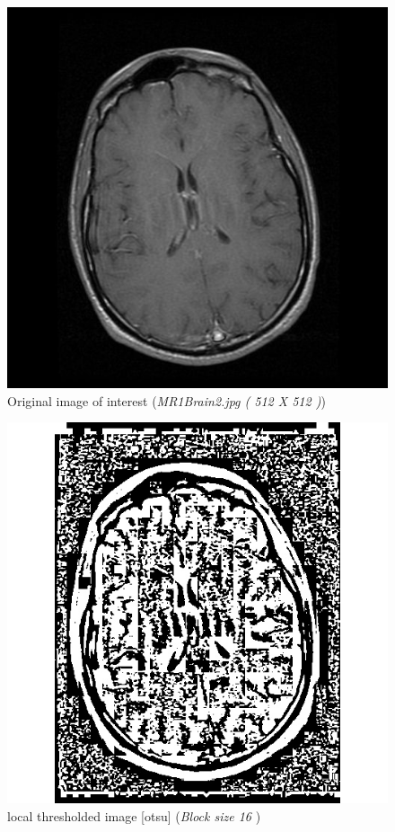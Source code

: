 \documentclass[letterpaper, 12 pt, conference ,onecolumn]{ieeeconf}  %
\begin{document}
\begin{figure}[h!]
\centering
\includegraphics[width=0.4\paperwidth]{optimal-thresholding/global/MRI-original-image.jpg}
\caption{Original image of interest (\textit{MR1Brain2.jpg ( 512 X 512 )}) }
\label{fig:MRI-original-image}
\end{figure}


\begin{figure}[h!]
\includegraphics[width=0.4\paperwidth]{otsu-thresholding/local/MRI-local-threshold-otsu16.jpg}
\centering
\caption{local thresholded image [otsu] (\textit{Block size 16 }) }
\label{fig:MRI-local-threshold-otsu16}
\end{figure}
\end{document}
